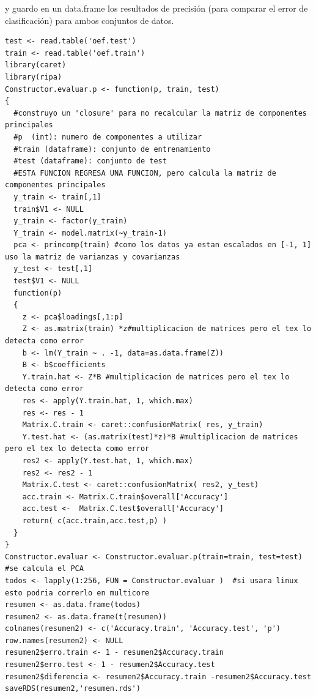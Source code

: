 \documentclass[paper=letter, fontsize=11pt]{scrartcl}
\numberwithin{equation}{section} %
\numberwithin{figure}{section} %
\numberwithin{table}{section} %
\begin{document}
\begin{enumerate}
y guardo en un data.frame los resultados de precisión (para comparar el error de clasificación) para ambos conjuntos de datos.\\
\begin{lstlisting}[style=customc,basicstyle=\scriptsize]
test <- read.table('oef.test')
train <- read.table('oef.train')
library(caret)
library(ripa)
Constructor.evaluar.p <- function(p, train, test)
{
  #construyo un 'closure' para no recalcular la matriz de componentes principales
  #p  (int): numero de componentes a utilizar
  #train (dataframe): conjunto de entrenamiento 
  #test (dataframe): conjunto de test
  #ESTA FUNCION REGRESA UNA FUNCION, pero calcula la matriz de componentes principales
  y_train <- train[,1]
  train$V1 <- NULL
  y_train <- factor(y_train)
  Y_train <- model.matrix(~y_train-1)
  pca <- princomp(train) #como los datos ya estan escalados en [-1, 1] uso la matriz de varianzas y covarianzas
  y_test <- test[,1]
  test$V1 <- NULL
  function(p)
  {
    z <- pca$loadings[,1:p]
    Z <- as.matrix(train) *z#multiplicacion de matrices pero el tex lo detecta como error
    b <- lm(Y_train ~ . -1, data=as.data.frame(Z))
    B <- b$coefficients
    Y.train.hat <- Z*B #multiplicacion de matrices pero el tex lo detecta como error
    res <- apply(Y.train.hat, 1, which.max)
    res <- res - 1
    Matrix.C.train <- caret::confusionMatrix( res, y_train)
    Y.test.hat <- (as.matrix(test)*z)*B #multiplicacion de matrices pero el tex lo detecta como error
    res2 <- apply(Y.test.hat, 1, which.max)
    res2 <- res2 - 1
    Matrix.C.test <- caret::confusionMatrix( res2, y_test)
    acc.train <- Matrix.C.train$overall['Accuracy']
    acc.test <-  Matrix.C.test$overall['Accuracy']
    return( c(acc.train,acc.test,p) )
  }
}
Constructor.evaluar <- Constructor.evaluar.p(train=train, test=test) #se calcula el PCA
todos <- lapply(1:256, FUN = Constructor.evaluar )  #si usara linux esto podria correrlo en multicore
resumen <- as.data.frame(todos)  
resumen2 <- as.data.frame(t(resumen))
colnames(resumen2) <- c('Accuracy.train', 'Accuracy.test', 'p')
row.names(resumen2) <- NULL
resumen2$erro.train <- 1 - resumen2$Accuracy.train
resumen2$erro.test <- 1 - resumen2$Accuracy.test
resumen2$diferencia <- resumen2$Accuracy.train -resumen2$Accuracy.test
saveRDS(resumen2,'resumen.rds')
\end{lstlisting} 



\end{enumerate}
\end{document}
